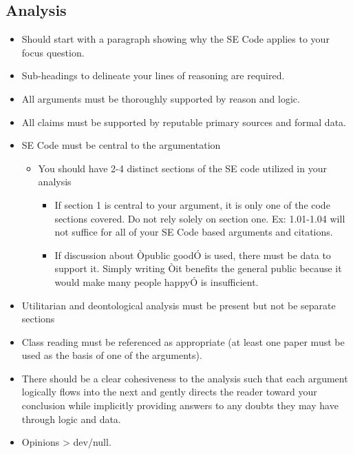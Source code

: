 \documentclass[11pt]{article}
\begin{document}
\begin{multicols}{2}
\section{Analysis} \begin{itemize} \item Should start with a paragraph showing
    why the SE Code applies to your focus
question.  \item Sub-headings to
    delineate your lines of reasoning are required.  \item All arguments must be
      thoroughly supported by reason and logic.  \item All claims must be
      supported by reputable primary sources and formal data.  \item SE Code
      must be central to the argumentation \begin{itemize} \item You should have
            2-4 distinct sections of the SE code utilized in your analysis
          \begin{itemize} \item If section 1 is central to your argument, it is
                only one of the code sections covered. Do not rely solely on
                section one. Ex: 1.01-1.04 will not suffice for all of your SE
                Code based arguments and citations.  \item If discussion about
                  Òpublic goodÓ is used, there must be data to support it.
                  Simply writing Òit benefits the general public because it
                  would make many people happyÓ is insufficient.  \end{itemize}
            \end{itemize} \item Utilitarian and deontological analysis must be
            present but not be separate sections \item Class reading must be
              referenced as appropriate (at least one paper must be used as the
              basis of one of the arguments).  \item There should be a clear
                cohesiveness to the analysis such that each argument logically
                flows into the next and gently directs the reader toward your
                conclusion while implicitly providing answers to any doubts they
                may have through logic and data.  \item Opinions > dev/null.
              \cite{handout} \end{itemize}


\end{multicols}
\end{document}

